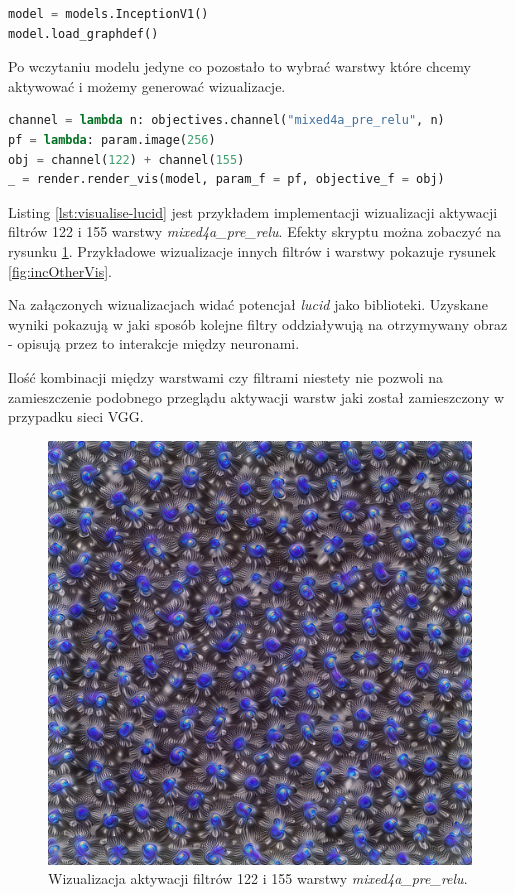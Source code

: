 \label{lst:load-model-lucid}
\begin{lstlisting}[language=Python, caption={Wczytywanie modelu GoogleLeNet w \textit{lucid}.}, captionpos=b]
model = models.InceptionV1()
model.load_graphdef()
\end{lstlisting}

Po wczytaniu modelu jedyne co pozostało to wybrać warstwy które chcemy aktywować i możemy generować wizualizacje.

\label{lst:visualise-lucid}
\begin{lstlisting}[language=Python, caption={Generowanie wizualizacji neuronów przy użyciu \textit{lucid}.}, captionpos=b]
channel = lambda n: objectives.channel("mixed4a_pre_relu", n)
pf = lambda: param.image(256)
obj = channel(122) + channel(155)
_ = render.render_vis(model, param_f = pf, objective_f = obj)
\end{lstlisting}

Listing \ref{lst:visualise-lucid} jest przykładem implementacji wizualizacji aktywacji filtrów 122 i 155 warstwy \textit{mixed4a\_pre\_relu}.
Efekty skryptu można zobaczyć na rysunku \ref{fig:inc122i155}. Przykładowe wizualizacje innych filtrów i warstwy pokazuje rysunek \ref{fig:incOtherVis}.

Na załączonych wizualizacjach widać potencjał \textit{lucid} jako biblioteki. Uzyskane wyniki pokazują w jaki sposób kolejne filtry oddziaływują na otrzymywany obraz - opisują przez to interakcje między neuronami.

Ilość kombinacji między warstwami czy filtrami niestety nie pozwoli na zamieszczenie podobnego przeglądu aktywacji warstw jaki został zamieszczony w przypadku sieci VGG. 
\begin{figure}[ht]
\centerline{\includegraphics[scale=0.5]{resources/inception/mixed4a_pre_relu_122i155.png}}
\caption{Wizualizacja aktywacji filtrów 122 i 155 warstwy \textit{mixed4a\_pre\_relu}.}
\label{fig:inc122i155}
\end{figure}

